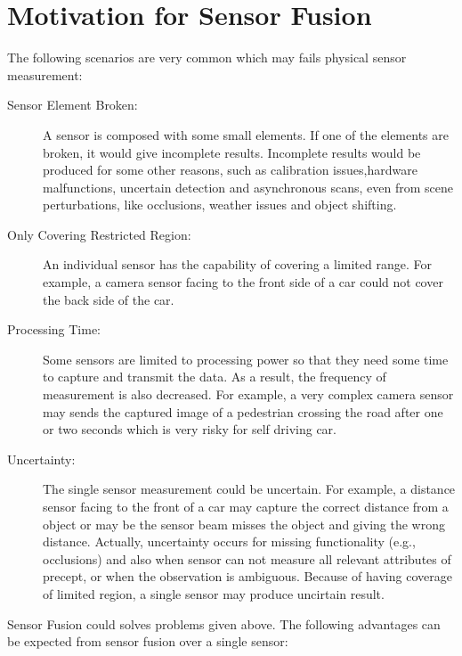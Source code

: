 \section{Motivation for Sensor Fusion}
The following scenarios are very common which may fails physical sensor measurement\cite{Wilfried2002}:
\begin{description}
    \item[Sensor Element Broken:] A sensor is composed with some small elements. If one of the elements are broken, it would give incomplete results. Incomplete results would be produced for some other reasons, such as calibration issues,hardware malfunctions, uncertain detection and asynchronous scans, even from scene perturbations, like occlusions, weather issues and object shifting.
    \item[Only Covering Restricted Region:] An individual sensor has the capability of covering a limited range. For example, a camera sensor facing to the front side of a car could not cover the back side of the car.
    \item[Processing Time:] Some sensors are limited to processing power so that they need some time to capture and transmit the data. As a result, the frequency of measurement is also decreased. For example, a very complex camera sensor may sends the captured image of a pedestrian crossing the road after one or two seconds which is very risky for self driving car.
    \item[Uncertainty:] The single sensor measurement could be uncertain. For example, a distance sensor facing to the front of a car may capture the correct distance from a object or may be the sensor beam misses the object and giving the wrong distance. Actually, uncertainty occurs for missing functionality (e.g., occlusions) and also when sensor can not measure all relevant attributes of precept, or when the observation is ambiguous\cite{Wilfried2002}. Because of having coverage of limited region, a single sensor may produce uncirtain result\cite{Wilfried2002}.
\end{description}
Sensor Fusion could solves problems given above. The following advantages can be expected from sensor fusion over a single sensor\cite{Wilfried2002}:
